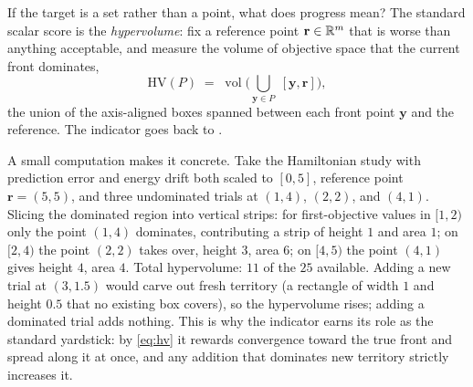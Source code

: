If the target is a set rather than a point, what does progress mean? The
standard scalar score is the \emph{hypervolume}: fix a reference point
$\mathbf{r} \in \mathbb{R}^m$ that is worse than anything acceptable, and measure
the volume of objective space that the current front dominates,
\begin{equation}
\mathrm{HV}(P) \;=\; \operatorname{vol}\!\Big(
\bigcup_{\mathbf{y} \in P} \; [\mathbf{y}, \mathbf{r}] \Big),
\label{eq:hv}
\end{equation}
the union of the axis-aligned boxes spanned between each front point
$\mathbf{y}$ and the reference. The indicator goes back to
\citet{zitzler1999spea}.

A small computation makes it concrete. Take
the Hamiltonian study with prediction error and energy drift both scaled
to $[0,5]$, reference point $\mathbf{r} = (5,5)$, and three undominated
trials at $(1,4)$, $(2,2)$, and $(4,1)$. Slicing the dominated region
into vertical strips: for first-objective values in $[1,2)$ only the
point $(1,4)$ dominates, contributing a strip of height $1$ and area
$1$; on $[2,4)$ the point $(2,2)$ takes over, height $3$, area $6$; on
$[4,5)$ the point $(4,1)$ gives height $4$, area $4$. Total hypervolume:
$11$ of the $25$ available. Adding a new trial at $(3, 1.5)$ would carve
out fresh territory (a rectangle of width $1$ and height $0.5$ that no
existing box covers), so the hypervolume rises; adding a dominated trial
adds nothing. This is why the indicator earns its role as the standard
yardstick: by \eqref{eq:hv} it rewards convergence toward the true front
and spread along it at once, and any addition that dominates new
territory strictly increases it.


